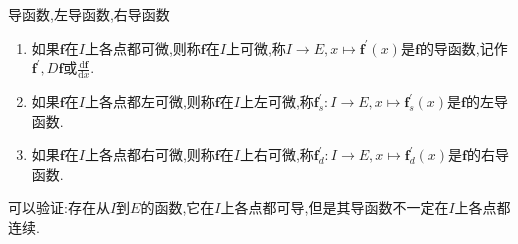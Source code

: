 \begin{definition}{导函数,左导函数,右导函数}{}
	\begin{enumerate}
		\item 如果$\mathbf{f}$在$I$上各点都可微,则称$\mathbf{f}$在$I$上可微,称$I\to E,x\mapsto\mathbf{f}^{\prime}\left(x\right)$是$\mathbf{f}$的导函数,记作$\mathbf{f}^{\prime},D\mathbf{f}$或$\frac{\mathrm{d}\mathbf{f}}{\mathrm{d}x}$.
		\item 如果$\mathbf{f}$在$I$上各点都左可微,则称$\mathbf{f}$在$I$上左可微,称$\mathbf{f}_{s}^{\prime}:I\to E,x\mapsto\mathbf{f}_{s}^{\prime}\left(x\right)$是$\mathbf{f}$的左导函数.
		\item 如果$\mathbf{f}$在$I$上各点都右可微,则称$\mathbf{f}$在$I$上右可微,称$\mathbf{f}_{d}^{\prime}:I\to E,x\mapsto\mathbf{f}_{d}^{\prime}\left(x\right)$是$\mathbf{f}$的右导函数.
	\end{enumerate}
\end{definition}

\begin{remark}{}{}
	可以验证:存在从$I$到$E$的函数,它在$I$上各点都可导,但是其导函数不一定在$I$上各点都连续.
\end{remark}























